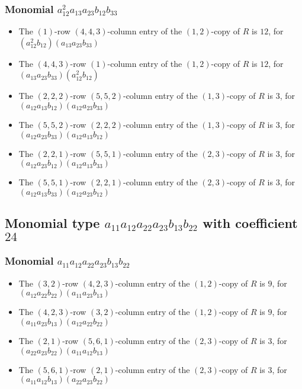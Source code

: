 \documentclass{article}
\begin{document}
\subsubsection{Monomial $ a_{12}^{2} a_{13} a_{23} b_{12} b_{33} $}

\begin{itemize}
\item The $(1)$-row $(4, 4, 3)$-column entry of the $ \left(1, 2\right) $-copy of $R$ is $ 12 $, for $( a_{12}^{2} b_{12} )( a_{13} a_{23} b_{33} )$ 
\item The $(4, 4, 3)$-row $(1)$-column entry of the $ \left(1, 2\right) $-copy of $R$ is $ 12 $, for $( a_{13} a_{23} b_{33} )( a_{12}^{2} b_{12} )$ 
\item The $(2, 2, 2)$-row $(5, 5, 2)$-column entry of the $ \left(1, 3\right) $-copy of $R$ is $ 3 $, for $( a_{12} a_{13} b_{12} )( a_{12} a_{23} b_{33} )$ 
\item The $(5, 5, 2)$-row $(2, 2, 2)$-column entry of the $ \left(1, 3\right) $-copy of $R$ is $ 3 $, for $( a_{12} a_{23} b_{33} )( a_{12} a_{13} b_{12} )$ 
\item The $(2, 2, 1)$-row $(5, 5, 1)$-column entry of the $ \left(2, 3\right) $-copy of $R$ is $ 3 $, for $( a_{12} a_{23} b_{12} )( a_{12} a_{13} b_{33} )$ 
\item The $(5, 5, 1)$-row $(2, 2, 1)$-column entry of the $ \left(2, 3\right) $-copy of $R$ is $ 3 $, for $( a_{12} a_{13} b_{33} )( a_{12} a_{23} b_{12} )$ 
\end{itemize}
\subsection{Monomial type $ a_{11} a_{12} a_{22} a_{23} b_{13} b_{22} $ with coefficient $ 24 $}

\subsubsection{Monomial $ a_{11} a_{12} a_{22} a_{23} b_{13} b_{22} $}

\begin{itemize}
\item The $(3, 2)$-row $(4, 2, 3)$-column entry of the $ \left(1, 2\right) $-copy of $R$ is $ 9 $, for $( a_{12} a_{22} b_{22} )( a_{11} a_{23} b_{13} )$ 
\item The $(4, 2, 3)$-row $(3, 2)$-column entry of the $ \left(1, 2\right) $-copy of $R$ is $ 9 $, for $( a_{11} a_{23} b_{13} )( a_{12} a_{22} b_{22} )$ 
\item The $(2, 1)$-row $(5, 6, 1)$-column entry of the $ \left(2, 3\right) $-copy of $R$ is $ 3 $, for $( a_{22} a_{23} b_{22} )( a_{11} a_{12} b_{13} )$ 
\item The $(5, 6, 1)$-row $(2, 1)$-column entry of the $ \left(2, 3\right) $-copy of $R$ is $ 3 $, for $( a_{11} a_{12} b_{13} )( a_{22} a_{23} b_{22} )$ 
\end{itemize}
\end{document}
